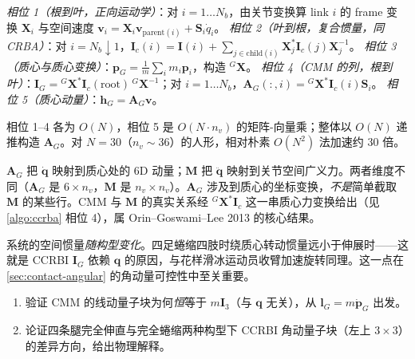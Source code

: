 \begin{algo}
\label{algo:ccrba}
\emph{相位 1（根到叶，正向运动学）}：对 $i=1\dots N_b$，由关节变换算 link $i$ 的 frame 变换 $\mathbf{X}_i$ 与空间速度 $\boldsymbol{v}_i=\mathbf{X}_i\boldsymbol{v}_{\mathrm{parent}(i)}+\mathbf{S}_i\dot{q}_i$。
\emph{相位 2（叶到根，复合惯量，同 CRBA）}：对 $i=N_b\downarrow1$，$\mathbf{I}_c(i)=\mathbf{I}(i)+\sum_{j\in\mathrm{child}(i)}\mathbf{X}_j^*\mathbf{I}_c(j)\mathbf{X}_j^{-1}$。
\emph{相位 3（质心与质心变换）}：$\boldsymbol{p}_G=\tfrac1m\sum_i m_i\boldsymbol{p}_i$，构造 ${}^G\mathbf{X}$。
\emph{相位 4（CMM 的列，根到叶）}：$\mathbf{I}_G={}^G\mathbf{X}^*\mathbf{I}_c(\mathrm{root})\,{}^G\mathbf{X}^{-1}$；对 $i=1\dots N_b$，$\mathbf{A}_G(:,i)={}^G\mathbf{X}^*\mathbf{I}_c(i)\mathbf{S}_i$。
\emph{相位 5（质心动量）}：$\boldsymbol{h}_G=\mathbf{A}_G\boldsymbol{v}$。
\end{algo}

\noindent 相位 1--4 各为 $O(N)$，相位 5 是 $O(N\cdot n_v)$ 的矩阵-向量乘；整体以 $O(N)$ 递推构造 $\mathbf{A}_G$。对 $N=30$（$n_v\sim36$）的人形，相对朴素 $O(N^2)$ 法加速约 $30$ 倍。

\begin{pitfall}
$\mathbf{A}_G$ 把 $\dot{\boldsymbol{q}}$ 映射到质心处的 6D 动量；$\mathbf{M}$ 把 $\ddot{\boldsymbol{q}}$ 映射到关节空间广义力。两者维度不同（$\mathbf{A}_G$ 是 $6\times n_v$，$\mathbf{M}$ 是 $n_v\times n_v$）。$\mathbf{A}_G$ 涉及到质心的坐标变换，\emph{不是}简单截取 $\mathbf{M}$ 的某些行。CMM 与 $\mathbf{M}$ 的真实关系经 ${}^G\mathbf{X}^*\mathbf{I}_c$ 这一串质心力变换给出（见 \cref{algo:ccrba} 相位 4），属 Orin--Goswami--Lee 2013 的核心结果。
\end{pitfall}

\begin{pitfall}
系统的空间惯量\emph{随构型变化}。四足蜷缩四肢时绕质心转动惯量远小于伸展时——这就是 CCRBI $\mathbf{I}_G$ 依赖 $\boldsymbol{q}$ 的原因，与花样滑冰运动员收臂加速旋转同理。这一点在 \cref{sec:contact-angular} 的角动量可控性中至关重要。
\end{pitfall}

\begin{practice}
\begin{enumerate}
  \item 验证 CMM 的线动量子块为何\emph{恒}等于 $m\mathbf{I}_3$（与 $\boldsymbol{q}$ 无关），从 $\boldsymbol{l}_G=m\dot{\boldsymbol{p}}_G$ 出发。
  \item 论证四条腿完全伸直与完全蜷缩两种构型下 CCRBI 角动量子块（左上 $3\times3$）的差异方向，给出物理解释。
\end{enumerate}
\end{practice}

